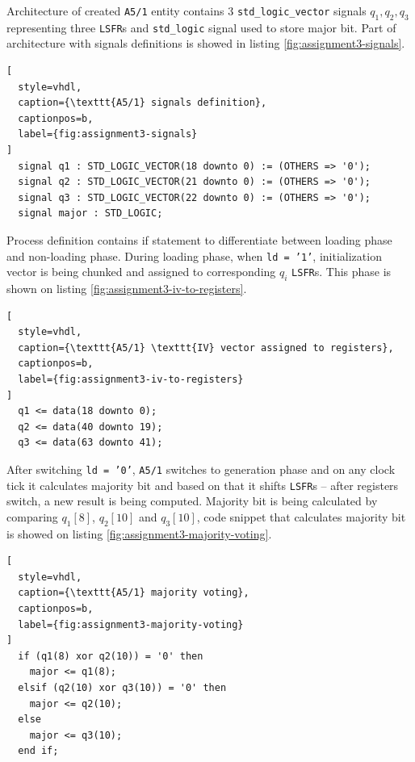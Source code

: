 Architecture of created \texttt{A5/1} entity contains 3 \texttt{std\_logic\_vector}
signals $q_1, q_2, q_3$ representing three \texttt{LSFR}s and \texttt{std\_logic}
signal used to store major bit. Part of architecture with signals definitions
is showed in listing \ref{fig:assignment3-signals}.

\begin{lstlisting}[
  style=vhdl,
  caption={\texttt{A5/1} signals definition},
  captionpos=b,
  label={fig:assignment3-signals}
]
  signal q1 : STD_LOGIC_VECTOR(18 downto 0) := (OTHERS => '0');
  signal q2 : STD_LOGIC_VECTOR(21 downto 0) := (OTHERS => '0');
  signal q3 : STD_LOGIC_VECTOR(22 downto 0) := (OTHERS => '0');
  signal major : STD_LOGIC;
\end{lstlisting}

Process definition contains if statement to differentiate between
loading phase and non-loading phase. During loading phase, when \texttt{ld = '1'},
initialization vector is being chunked and assigned to corresponding $q_i$
\texttt{LSFR}s. This phase is shown on listing \ref{fig:assignment3-iv-to-registers}.

\begin{lstlisting}[
  style=vhdl,
  caption={\texttt{A5/1} \texttt{IV} vector assigned to registers},
  captionpos=b,
  label={fig:assignment3-iv-to-registers}
]
  q1 <= data(18 downto 0);
  q2 <= data(40 downto 19);
  q3 <= data(63 downto 41);
\end{lstlisting}

After switching \texttt{ld = '0'}, \texttt{A5/1} switches to
generation phase and on any clock tick it calculates majority bit and based on
that it shifts \texttt{LSFR}s -- after registers switch, a new result is being
computed. Majority bit is being calculated by comparing $q_1[8]$, $q_2[10]$ and
$q_3[10]$, code snippet that calculates majority bit is showed on listing
\ref{fig:assignment3-majority-voting}.

\begin{lstlisting}[
  style=vhdl,
  caption={\texttt{A5/1} majority voting},
  captionpos=b,
  label={fig:assignment3-majority-voting}
]
  if (q1(8) xor q2(10)) = '0' then
    major <= q1(8);
  elsif (q2(10) xor q3(10)) = '0' then
    major <= q2(10);
  else
    major <= q3(10);
  end if;
\end{lstlisting}

